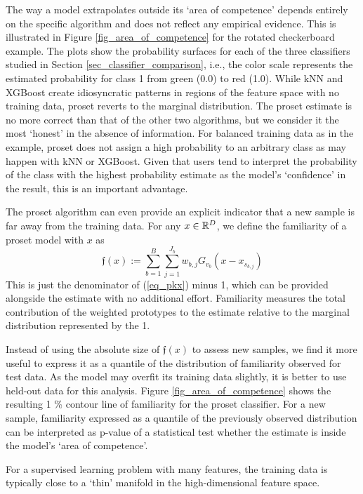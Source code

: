The way a model extrapolates outside its `area of competence' depends entirely on the specific algorithm and does not reflect any empirical evidence.
This is illustrated in Figure \ref{fig_area_of_competence} for the rotated checkerboard example.
The plots show the probability surfaces for each of the three classifiers studied in Section \ref{sec_classifier_comparison}, i.e., the color scale represents the estimated probability for class 1 from green (0.0) to red (1.0).
While kNN and XGBoost create idiosyncratic patterns in regions of the feature space with no training data, proset reverts to the marginal distribution.
The proset estimate is no more correct than that of the other two algorithms, but we consider it the most `honest' in the absence of information.
For balanced training data as in the example, proset does not assign a high probability to an arbitrary class as may happen with kNN or XGBoost.
Given that users tend to interpret the probability of the class with the highest probability estimate as the model's `confidence' in the result, this is an important advantage.\par
%
The proset algorithm can even provide an explicit indicator that a new sample is far away from the training data.
For any $x\in\mathbb{R}^D$, we define the familiarity of a proset model with $x$ as
%
\begin{equation}
\mathfrak{f}(x):=\sum_{b=1}^B\sum_{j=1}^{J_b}w_{b,j}G_{v_b}(x-x_{s_{b,j}})\label{eq_familiarity}
\end{equation}
%
This is just the denominator of (\ref{eq_pkx}) minus 1, which can be provided alongside the estimate with no additional effort.
Familiarity measures the total contribution of the weighted prototypes to the estimate relative to the marginal distribution represented by the 1.\par
%
Instead of using the absolute size of $\mathfrak{f}(x)$ to assess new samples, we find it more useful to express it as a quantile of the distribution of familiarity observed for test data.
As the model may overfit its training data slightly, it is better to use held-out data for this analysis.
Figure \ref{fig_area_of_competence} shows the resulting 1 \% contour line of familiarity for the proset classifier.
For a new sample, familiarity expressed as a quantile of the previously observed distribution can be interpreted as p-value of a statistical test whether the estimate is inside the model's `area of competence'.\par
%
For a supervised learning problem with many features, the training data is typically close to a `thin' manifold in the high-dimensional feature space.
